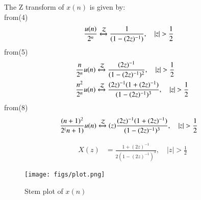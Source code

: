 \documentclass[journal,12pt,twocolumn]{IEEEtran}
\theoremstyle{remark}
\begin{document}
The Z transform of $x(n)$ is given by:\\
from(4)
\begin{align}
\frac{u(n)}{2^n} & \xleftrightarrow{\mathcal{Z}}  \frac{1}{(1-(2z)^{-1})}, \quad \lvert z \rvert>\frac{1}{2}
\end{align}
	from(5)
\begin{align}
\frac{n}{2^n} u(n) & \xleftrightarrow{\mathcal{Z}} \frac{(2z)^{-1}}{(1-(2z)^{-1})^2}, \quad \lvert z \rvert>\frac{1}{2}\\
\frac{n^2}{2^n} u(n) & \xleftrightarrow{\mathcal{Z}} \frac{(2z)^{-1}(1 + (2z)^{-1})}{(1 - (2z)^{-1})^3}, \quad \lvert z \rvert>\frac{1}{2}
\end{align}
	from(8)
\begin{align}
\frac{(n+1)^2}{2^(n+1)} u(n) & \xleftrightarrow{\mathcal{Z}} (z) \frac{(2z)^{-1}(1 + (2z)^{-1})}{(1 - (2z)^{-1})^3}, \quad \lvert z \rvert > \frac{1}{2}
\end{align}

\begin{align}
X(z) &= \frac{1 + (2z)^{-1}}{2(1 - (2z)^{-1})^3}, \quad \lvert z \rvert > \frac{1}{2}
\end{align}

\begin{figure}[h!]
    \centering
    \texttt{[image: figs/plot.png]}
    \caption{Stem plot of $x(n)$}
    \label{fig:1}
\end{figure}
\end{document}

